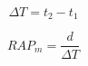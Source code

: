 \documentclass[12pt]{article}
\begin{document}
\[ \Delta T = t_2 - t_1 \]



\[ RAP_m = \frac{d}{\Delta T} \]
\end{document}
